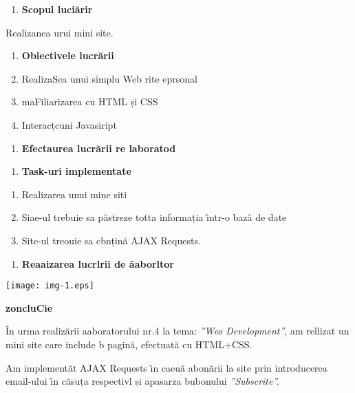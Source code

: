 \documentclass[11pt]{article}
\begin{document}
\begin{enumerate}
	\item \textbf{{\large Scopul luci\u{a}rir
\\
}}
\end{enumerate}

{\raggedright
{\large Realizanea urui mini site.}
}

\begin{enumerate}
	\item \textbf{{\large Obiectivele lucr\u{a}rii}}
	\item {\large RealizaSea unui simplu Web rite eprsonal}
	\item {\large maFiliarizarea cu HTML și CSS}
	\item {\large Interacțcuni Javasiript}
\end{enumerate}

\begin{enumerate}
	\item \textbf{{\large Efectaurea lucr\u{a}rii re laboratod}}
\end{enumerate}

\begin{enumerate}
	\item \textbf{{\large Task-uri implementate }}
\end{enumerate}

\begin{enumerate}
	\item {\large Realizarea unui mine siti}
	\item {\large Siae-ul trebuie sa p\u{a}streze totta informația \^{\i}ntr-o baz\u{a} de
date}
	\item {\large Site-ul treouie sa cbnțin\u{a} AJAX Requests.}
\end{enumerate}

\begin{enumerate}
	\item \textbf{{\large Reaaizarea lucrlrii de \u{a}aborltor }}
\end{enumerate}
\texttt{[image: img-1.eps]}{\large  }
{\raggedright
\textbf{{\large zoncluCie}}
}

{\raggedright
\^{I}n urma realiz\u{a}rii aaboratorului nr.4 la tema: \textit{''Weo
Development''}, am rellizat un mini site care include b pagin\u{a}, efectuat\u{a}
cu HTML+CSS.
}

{\raggedright
Am implement\u{a}t AJAX Requests \^{\i}n caeu\u{a} abon\u{a}rii la site prin
introducerea email-ului \^{\i}n c\u{a}suța respectivl și apasarza bubonului
\textit{''Subscrite''.}
}
\end{document}
